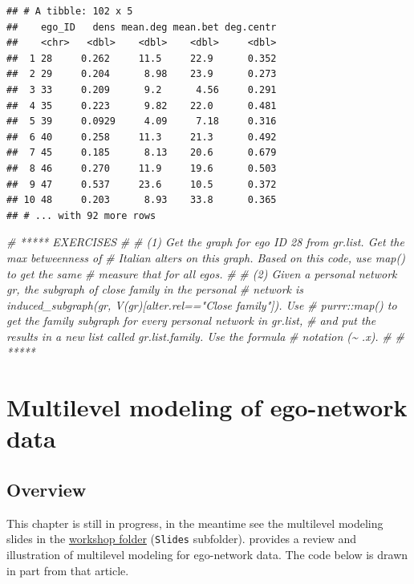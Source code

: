 \documentclass[
]{book}
\newenvironment{Shaded}{\begin{snugshade}}{\end{snugshade}}
\newcommand{\CommentTok}[1]{\textcolor[rgb]{0.56,0.35,0.01}{\textit{#1}}}
\begin{document}
\begin{verbatim}
## # A tibble: 102 x 5
##    ego_ID   dens mean.deg mean.bet deg.centr
##    <chr>   <dbl>    <dbl>    <dbl>     <dbl>
##  1 28     0.262     11.5     22.9      0.352
##  2 29     0.204      8.98    23.9      0.273
##  3 33     0.209      9.2      4.56     0.291
##  4 35     0.223      9.82    22.0      0.481
##  5 39     0.0929     4.09     7.18     0.316
##  6 40     0.258     11.3     21.3      0.492
##  7 45     0.185      8.13    20.6      0.679
##  8 46     0.270     11.9     19.6      0.503
##  9 47     0.537     23.6     10.5      0.372
## 10 48     0.203      8.93    33.8      0.365
## # ... with 92 more rows
\end{verbatim}

\begin{Shaded}
\begin{Highlighting}[]
\CommentTok{\# ***** EXERCISES}
\CommentTok{\#}
\CommentTok{\# (1) Get the graph for ego ID 28 from gr.list. Get the max betweenness of}
\CommentTok{\# Italian alters on this graph. Based on this code, use map() to get the same}
\CommentTok{\# measure that for all egos.}
\CommentTok{\#}
\CommentTok{\# (2) Given a personal network gr, the subgraph of close family in the personal}
\CommentTok{\# network is induced\_subgraph(gr, V(gr)[alter.rel=="Close family"]). Use}
\CommentTok{\# purrr::map() to get the family subgraph for every personal network in gr.list,}
\CommentTok{\# and put the results in a new list called gr.list.family. Use the formula}
\CommentTok{\# notation (\textasciitilde{} .x).}
\CommentTok{\#}
\CommentTok{\# *****}
\end{Highlighting}
\end{Shaded}

\hypertarget{multilevel}{%
\chapter{Multilevel modeling of ego-network data}\label{multilevel}}

\hypertarget{overview-4}{%
\section{Overview}\label{overview-4}}

This chapter is still in progress, in the meantime see the multilevel modeling slides in the \href{http://www.raffaelevacca.com/teaching/egocentric-r/folder/}{workshop folder} (\texttt{Slides} subfolder). \citet{vacca_multilevel_2018} provides a review and illustration of multilevel modeling for ego-network data. The code below is drawn in part from that article.
\end{document}
